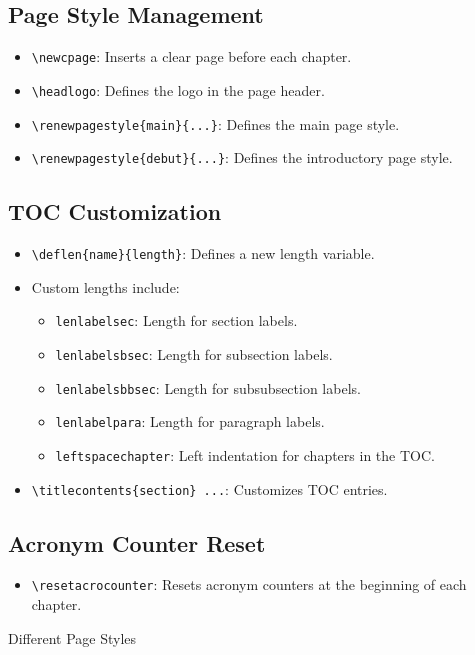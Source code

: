 \documentclass[12pt,twoside]{report}
\begin{document}
\subsection{Page Style Management}
\begin{itemize}
    \item \verb|\newcpage|: Inserts a clear page before each chapter.
    \item \verb|\headlogo|: Defines the logo in the page header.
    \item \verb|\renewpagestyle{main}{...}|: Defines the main page style.
    \item \verb|\renewpagestyle{debut}{...}|: Defines the introductory page style.
\end{itemize}

\subsection{TOC Customization}
\begin{itemize}
    \item \verb|\deflen{name}{length}|: Defines a new length variable.
    \item Custom lengths include:
    \begin{itemize}
        \item \verb|lenlabelsec|: Length for section labels.
        \item \verb|lenlabelsbsec|: Length for subsection labels.
        \item \verb|lenlabelsbbsec|: Length for subsubsection labels.
        \item \verb|lenlabelpara|: Length for paragraph labels.
        \item \verb|leftspacechapter|: Left indentation for chapters in the TOC.
    \end{itemize}
    \item \verb|\titlecontents{section} ...|: Customizes TOC entries.
\end{itemize}

\subsection{Acronym Counter Reset}
\begin{itemize}
    \item \verb|\resetacrocounter|: Resets acronym counters at the beginning of each chapter.
\end{itemize}





\appendix
\begin{achapter}{Different Page Styles}
\end{achapter}
\end{document}
